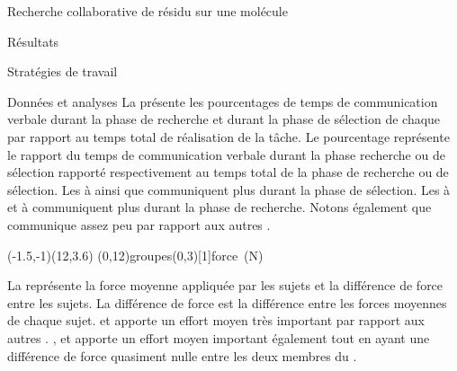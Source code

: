 \documentclass[myfrancais]{mythesis}
\begin{document}
\begin{mychapter}{Recherche collaborative de résidu sur une molécule}
\begin{mysection}{Résultats}
\begin{mysubsection}{Stratégies de travail}
\begin{mysubsubsection}{Données et analyses}
					La  présente les pourcentages de temps de communication verbale durant la phase de recherche et durant la phase de sélection de chaque  par rapport au temps total de réalisation de la tâche.
					Le pourcentage représente le rapport du temps de communication verbale durant la phase recherche ou de sélection rapporté respectivement au temps total de la phase de recherche ou de sélection.
					Les   à  ainsi que  communiquent plus durant la phase de sélection.
					Les   à  et  à  communiquent plus durant la phase de recherche.
					Notons également que  communique assez peu par rapport aux autres .

					\begin{myfigure}
						\begin{myps}(-1.5,-1)(12,3.6)
							\myaxes(0,12){groupes}(0,3)[1]{force~(N)}
						\end{myps}
					\end{myfigure}

					La  représente la force moyenne appliquée par les sujets  et la différence de force entre les sujets.
					La différence de force est la différence entre les forces moyennes de chaque sujet.
					 et  apporte un effort moyen très important par rapport aux autres .
					,  et  apporte un effort moyen important également tout en ayant une différence de force quasiment nulle entre les deux membres du .


\end{mysubsubsection}
\end{mysubsection}
\end{mysection}
\end{mychapter}
\end{document}
